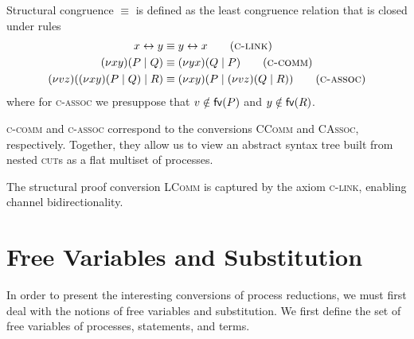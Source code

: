 \begin{definition} \label{def:pi-fd:struct-cong}
  Structural congruence $\equiv$ is defined as the least congruence relation
  that is closed under rules
  \begin{align*}
    \link{x}{y} &\equiv \link{y}{x} \tag{\textsc{c-link}} \\
    \parcomp{x}{y}{P}{Q} &\equiv \parcomp{y}{x}{Q}{P} \tag{\textsc{c-comm}} \\
    \parcomp{v}{z}{\parcomp{x}{y}{P}{Q}}{R}
      &\equiv \parcomp{x}{y}{P}{\parcomp{v}{z}{Q}{R}} \tag{\textsc{c-assoc}}
  \end{align*}
  where for \textsc{c-assoc} we presuppose that $v \notin \mathsf{fv}(P)$ and $y \notin \mathsf{fv}(R)$.
\end{definition}

\textsc{c-comm} and \textsc{c-assoc} correspond
to the conversions \textsc{CComm} and \textsc{CAssoc}, respectively.
Together, they allow us to view an abstract syntax tree built from nested \textsc{cut}s
as a flat multiset of processes.

The structural proof conversion \textsc{LComm} is captured by the axiom
\textsc{c-link}, enabling channel bidirectionality.

\section{Free Variables and Substitution}
In order to present the interesting conversions of process reductions, we
must first deal with the notions of free variables and substitution. We first
define the set of free variables of processes, statements, and terms.

